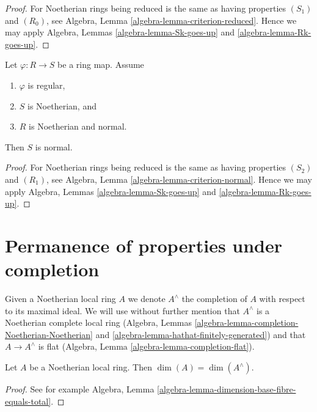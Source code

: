 \begin{proof}
For Noetherian rings being reduced is the same as having properties
$(S_1)$ and $(R_0)$, see
Algebra, Lemma \ref{algebra-lemma-criterion-reduced}.
Hence we may apply
Algebra, Lemmas \ref{algebra-lemma-Sk-goes-up} and
\ref{algebra-lemma-Rk-goes-up}.
\end{proof}

\begin{lemma}
\label{lemma-normal-goes-up}
Let $\varphi : R \to S$ be a ring map. Assume
\begin{enumerate}
\item $\varphi$ is regular,
\item $S$ is Noetherian, and
\item $R$ is Noetherian and normal.
\end{enumerate}
Then $S$ is normal.
\end{lemma}

\begin{proof}
For Noetherian rings being reduced is the same as having properties
$(S_2)$ and $(R_1)$, see
Algebra, Lemma \ref{algebra-lemma-criterion-normal}.
Hence we may apply
Algebra, Lemmas \ref{algebra-lemma-Sk-goes-up} and
\ref{algebra-lemma-Rk-goes-up}.
\end{proof}






\section{Permanence of properties under completion}
\label{section-permanence-completion}

\noindent
Given a Noetherian local ring $A$ we denote $A^\wedge$ the completion of
$A$ with respect to its maximal ideal. We will use without further mention
that $A^\wedge$ is a Noetherian complete local ring
(Algebra, Lemmas \ref{algebra-lemma-completion-Noetherian-Noetherian} and
\ref{algebra-lemma-hathat-finitely-generated})
and that $A \to A^\wedge$ is flat
(Algebra, Lemma \ref{algebra-lemma-completion-flat}).

\begin{lemma}
\label{lemma-completion-dimension}
Let $A$ be a Noetherian local ring.
Then $\dim(A) = \dim(A^\wedge)$.
\end{lemma}

\begin{proof}
See for example
Algebra, Lemma \ref{algebra-lemma-dimension-base-fibre-equals-total}.
\end{proof}

